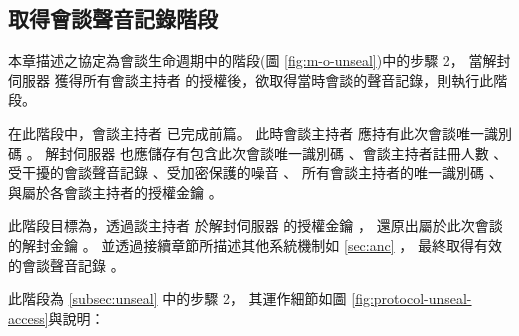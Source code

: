 \subsection{取得會談聲音記錄階段}\label{subsec:protocol-unseal-access}

    本章描述之協定為會談生命週期中的階段(圖 \ref{fig:m-o-unseal})中的步驟 2，
當解封伺服器 \DEFserver 獲得所有會談主持者 \DEFownerAll 的授權後，欲取得當時會談的聲音記錄，則執行此階段。

    在此階段中，會談主持者 \DEFowner 已完成前篇。
此時會談主持者 \DEFowner 應持有此次會談唯一識別碼 \DEFsessionID。
解封伺服器 \DEFserver 也應儲存有包含此次會談唯一識別碼 \DEFsessionID、會談主持者註冊人數 \DEFowreg、
受干擾的會談聲音記錄 \DEFrecJ、受加密保護的噪音 \DEFrecP、
所有會談主持者的唯一識別碼 \DEFownerID、與屬於各會談主持者的授權金鑰 \DEFagentKey。

    此階段目標為，透過談主持者 \DEFowner 於解封伺服器 \DEFserver 的授權金鑰 \DEFagentKey，
還原出屬於此次會談的解封金鑰 \DEFunsealKey。
並透過接續章節所描述其他系統機制如 \ref{sec:anc} ，
最終取得有效的會談聲音記錄 \DEFrecREV。

    此階段為 \ref{subsec:unseal} 中的步驟 2，
其運作細節如圖 \ref{fig:protocol-unseal-access}與說明：

